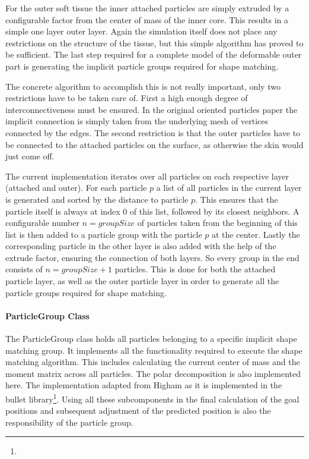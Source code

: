 For the outer soft tissue the inner attached particles are simply extruded by a configurable factor from the center of mass of the inner core. This results in a simple one layer outer layer. Again the simulation itself does not place any restrictions on the structure of the tissue, but this simple algorithm has proved to be sufficient. The last step required for a complete model of the deformable outer part is generating the implicit particle groups required for shape matching.

The concrete algorithm to accomplish this is not really important, only two restrictions have to be taken care of. First a high enough degree of interconnectiveness must be ensured. In the original oriented particles paper the implicit connection is simply taken from the underlying mesh of vertices connected by the edges. The second restriction is that the outer particles have to be connected to the attached particles on the surface, as otherwise the skin would just come off.

The current implementation iterates over all particles on each respective layer (attached and outer). For each particle $p$ a list of all particles in the current layer is generated and sorted by the distance to particle $p$. This ensures that the particle itself is always at index $0$ of this list, followed by its closest neighbors. A configurable number $n = groupSize$ of particles taken from the beginning of this list is then added to a particle group with the particle $p$ at the center. Lastly the corresponding particle in the other layer is also added with the help of the extrude factor, ensuring the connection of both layers. So every group in the end consists of $n = groupSize + 1$ particles. This is done for both the attached particle layer, as well as the outer particle layer in order to generate all the particle groups required for shape matching.

\paragraph{ParticleGroup Class}
The ParticleGroup class holds all particles belonging to a specific implicit shape matching group. It implements all the functionality required to execute the shape matching algorithm. This includes calculating the current center of mass and the moment matrix across all particles. The polar decomposition is also implemented here. The implementation adapted from Higham \cite{Higham:1986vx} as it is implemented in the bullet library\footnote{}. Using all these subcomponents in the final calculation of the goal positions and subsequent adjustment of the predicted position is also the responsibility of the particle group.


